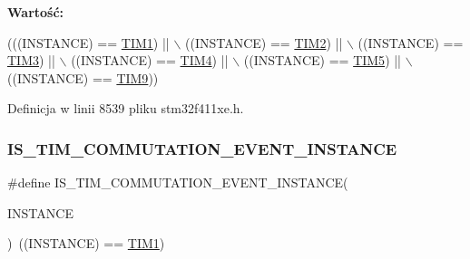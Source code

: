 {\bfseries Wartość\+:}
\begin{DoxyCode}
(((INSTANCE) == \hyperlink{group___peripheral__declaration_ga2e87451fea8dc9380056d3cfc5ed81fb}{TIM1}) || \(\backslash\)
                                                        ((INSTANCE) == \hyperlink{group___peripheral__declaration_ga3cfac9f2e43673f790f8668d48b4b92b}{TIM2}) || \(\backslash\)
                                                        ((INSTANCE) == \hyperlink{group___peripheral__declaration_ga61ee4c391385607d7af432b63905fcc9}{TIM3}) || \(\backslash\)
                                                        ((INSTANCE) == \hyperlink{group___peripheral__declaration_ga91a09bad8bdc7a1cb3d85cf49c94c8ec}{TIM4}) || \(\backslash\)
                                                        ((INSTANCE) == \hyperlink{group___peripheral__declaration_ga5125ff6a23a2ed66e2e19bd196128c14}{TIM5}) || \(\backslash\)
                                                        ((INSTANCE) == \hyperlink{group___peripheral__declaration_gaf52b4b4c36110a0addfa98059f54a50e}{TIM9}))
\end{DoxyCode}


Definicja w linii 8539 pliku stm32f411xe.\+h.

\mbox{\label{group___exported__macros_ga5f61206c3c8b20784f9d237dce300afd}} 
\subsubsection{\texorpdfstring{I\+S\+\_\+\+T\+I\+M\+\_\+\+C\+O\+M\+M\+U\+T\+A\+T\+I\+O\+N\+\_\+\+E\+V\+E\+N\+T\+\_\+\+I\+N\+S\+T\+A\+N\+CE}{IS\_TIM\_COMMUTATION\_EVENT\_INSTANCE}}
{\footnotesize\ttfamily \#define I\+S\+\_\+\+T\+I\+M\+\_\+\+C\+O\+M\+M\+U\+T\+A\+T\+I\+O\+N\+\_\+\+E\+V\+E\+N\+T\+\_\+\+I\+N\+S\+T\+A\+N\+CE(\begin{DoxyParamCaption}\item[{}]{I\+N\+S\+T\+A\+N\+CE }\end{DoxyParamCaption})~((I\+N\+S\+T\+A\+N\+CE) == \hyperlink{group___peripheral__declaration_ga2e87451fea8dc9380056d3cfc5ed81fb}{T\+I\+M1})}



